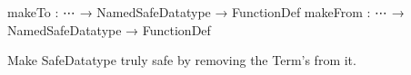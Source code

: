 makeTo : ⋯ → NamedSafeDatatype → FunctionDef
makeFrom : ⋯ → NamedSafeDatatype → FunctionDef

Make SafeDatatype truly safe by removing the Term's from it.



